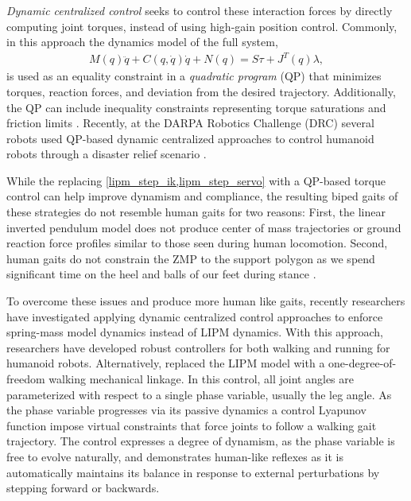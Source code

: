 \emph{Dynamic centralized control} seeks to control these interaction forces by
directly computing joint torques, instead of using high-gain position control.
Commonly, in this approach the dynamics model of the full
system,
\begin{align}
    M(q) \ddot{q} + C(q, \dot{q}) \dot{q} + N(q) = S\tau + J^T(q) \lambda,
    \label{eq:euler_lagrange}
\end{align}
is used as an equality constraint in a \emph{quadratic program} (QP) that
minimizes torques, reaction forces, and deviation from the desired trajectory.
Additionally, the QP can include inequality constraints representing torque
saturations and friction limits \citep{hutter2013hybrid, herzog2014balancing,
saab2013dynamic, wensing2013generation}. Recently, at the DARPA Robotics
Challenge (DRC) several robots used QP-based dynamic centralized approaches to
control humanoid robots through a disaster relief scenario
\citep{feng2015optimization, kuindersma2014efficiently,
englsberger2014trajectory}. 

While the replacing \cref{lipm_step_ik,lipm_step_servo} with a QP-based torque
control can help improve dynamism and compliance, the resulting biped gaits of
these strategies do not resemble human gaits for two reasons: First, the linear
inverted pendulum model does not produce center of mass trajectories or ground
reaction force profiles similar to those seen during human locomotion.  Second,
human gaits do not constrain the ZMP to the support polygon as we spend
significant time on the heel and balls of our feet during stance
\citep{perry1992gait}.

To overcome these issues and produce more human like gaits, recently researchers
have investigated applying dynamic centralized control approaches to enforce
spring-mass model dynamics instead of LIPM dynamics. With this approach,
researchers have developed robust controllers for both walking
\citep{wensing2013generation} and running \citep{martin2015robust} for humanoid
robots. Alternatively, \citet{sreenath2011compliant} replaced the LIPM model
with a one-degree-of-freedom walking mechanical linkage. In this control, all
joint angles are parameterized with respect to a single phase variable, usually
the leg angle. As the phase variable progresses via its passive dynamics a
control Lyapunov function impose virtual constraints that force joints to follow
a walking gait trajectory. The control expresses a degree of dynamism, as the
phase variable is free to evolve naturally, and demonstrates human-like reflexes
as it is automatically maintains its balance in response to external
perturbations by stepping forward or backwards.

